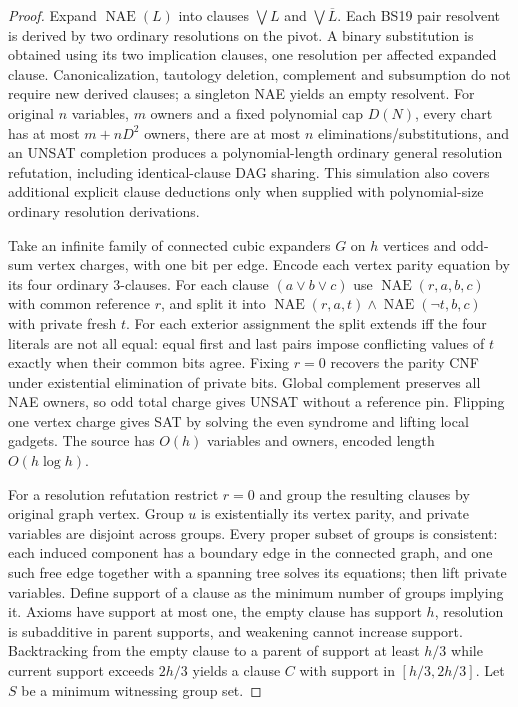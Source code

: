 \documentclass[11pt]{article}
\begin{document}
\begin{proof}
Expand $\operatorname{NAE}(L)$ into clauses $\bigvee L$ and $\bigvee\overline L$. Each BS19 pair resolvent is derived by two ordinary resolutions on the pivot. A binary substitution is obtained using its two implication clauses, one resolution per affected expanded clause. Canonicalization, tautology deletion, complement and subsumption do not require new derived clauses; a singleton NAE yields an empty resolvent. For original $n$ variables, $m$ owners and a fixed polynomial cap $D(N)$, every chart has at most $m+nD^2$ owners, there are at most $n$ eliminations/substitutions, and an UNSAT completion produces a polynomial-length ordinary general resolution refutation, including identical-clause DAG sharing. This simulation also covers additional explicit clause deductions only when supplied with polynomial-size ordinary resolution derivations.
 
Take an infinite family of connected cubic expanders $G$ on $h$ vertices and odd-sum vertex charges, with one bit per edge. Encode each vertex parity equation by its four ordinary 3-clauses. For each clause $(a\lor b\lor c)$ use $\operatorname{NAE}(r,a,b,c)$ with common reference $r$, and split it into $\operatorname{NAE}(r,a,t)\land\operatorname{NAE}(\neg t,b,c)$ with private fresh $t$. For each exterior assignment the split extends iff the four literals are not all equal: equal first and last pairs impose conflicting values of $t$ exactly when their common bits agree. Fixing $r=0$ recovers the parity CNF under existential elimination of private bits. Global complement preserves all NAE owners, so odd total charge gives UNSAT without a reference pin. Flipping one vertex charge gives SAT by solving the even syndrome and lifting local gadgets. The source has $O(h)$ variables and owners, encoded length $O(h\log h)$.
 
For a resolution refutation restrict $r=0$ and group the resulting clauses by original graph vertex. Group $u$ is existentially its vertex parity, and private variables are disjoint across groups. Every proper subset of groups is consistent: each induced component has a boundary edge in the connected graph, and one such free edge together with a spanning tree solves its equations; then lift private variables. Define support of a clause as the minimum number of groups implying it. Axioms have support at most one, the empty clause has support $h$, resolution is subadditive in parent supports, and weakening cannot increase support. Backtracking from the empty clause to a parent of support at least $h/3$ while current support exceeds $2h/3$ yields a clause $C$ with support in $[h/3,2h/3]$. Let $S$ be a minimum witnessing group set.
 

\end{proof}
\end{document}

